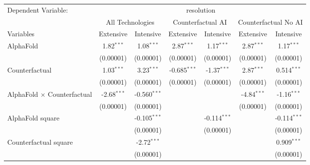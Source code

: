 \begingroup
\centering
\begin{tabular}{lcccccc}
   \tabularnewline \midrule \midrule
   Dependent Variable: & \multicolumn{6}{c}{resolution}\\
 & \multicolumn{2}{c}{All Technologies} & \multicolumn{2}{c}{Counterfactual AI} & \multicolumn{2}{c}{Counterfactual No AI} \\
\cmidrule(lr){1-1}\cmidrule(lr){2-3} \cmidrule(lr){4-5} \cmidrule(lr){6-7}
Variables & \multicolumn{1}{c}{Extensive} & \multicolumn{1}{c}{Intensive} & \multicolumn{1}{c}{Extensive} & \multicolumn{1}{c}{Intensive} & \multicolumn{1}{c}{Extensive} & \multicolumn{1}{c}{Intensive} \\
\cmidrule(lr){1-1}\cmidrule(lr){2-2} \cmidrule(lr){3-3} \cmidrule(lr){4-4} \cmidrule(lr){5-5} \cmidrule(lr){6-6} \cmidrule(lr){7-7}
   AlphaFold                          & 1.82$^{***}$  & 1.08$^{***}$   & 2.87$^{***}$   & 1.17$^{***}$   & 2.87$^{***}$  & 1.17$^{***}$\\   
                                      & (0.00001)     & (0.00001)      & (0.00001)      & (0.00001)      & (0.00001)     & (0.00001)\\   
   Counterfactual                     & 1.03$^{***}$  & 3.23$^{***}$   & -0.685$^{***}$ & -1.37$^{***}$  & 2.87$^{***}$  & 0.514$^{***}$\\   
                                      & (0.00001)     & (0.00001)      & (0.00001)      & (0.00001)      & (0.00001)     & (0.00001)\\   
   AlphaFold $\times$ Counterfactual  & -2.68$^{***}$ & -0.560$^{***}$ &                &                & -4.84$^{***}$ & -1.16$^{***}$\\   
                                      & (0.00001)     & (0.00001)      &                &                & (0.00001)     & (0.00001)\\   
   AlphaFold square                   &               & -0.105$^{***}$ &                & -0.114$^{***}$ &               & -0.114$^{***}$\\   
                                      &               & (0.00001)      &                & (0.00001)      &               & (0.00001)\\   
   Counterfactual square              &               & -2.72$^{***}$  &                &                &               & 0.909$^{***}$\\   
                                      &               & (0.00001)      &                &                &               & (0.00001)\\   

\end{tabular}
